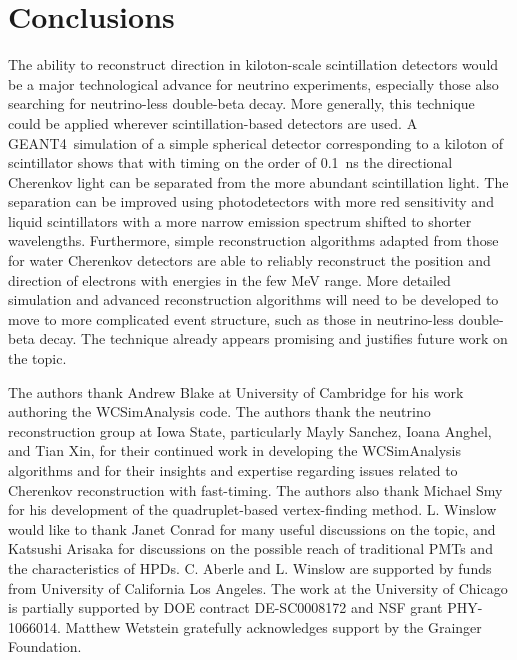 \documentclass[cits]{JINST}
\newcommand{\GEANT}{GEANT4}
\begin{document}
\section{Conclusions}
The ability to reconstruct direction in kiloton-scale scintillation
detectors would be a major technological advance for neutrino
experiments, especially those also
searching for neutrino-less double-beta decay. More generally, this technique could
be applied wherever scintillation-based detectors are used. A \GEANT~simulation of a simple spherical detector corresponding to a kiloton
of scintillator shows that with timing on the order of 0.1~ns the directional Cherenkov light can be separated from the more abundant
scintillation light. The separation can be improved using
photodetectors with more red sensitivity and liquid scintillators with
a more narrow emission spectrum shifted to shorter
wavelengths. Furthermore, simple reconstruction algorithms adapted
from those for water Cherenkov detectors are able to reliably
reconstruct the position and direction of electrons with energies in the few MeV range.
More detailed simulation and advanced reconstruction algorithms will need
to be developed to move to more complicated event structure, such as those in neutrino-less double-beta decay. The technique already
appears promising and justifies future work on the topic.


\acknowledgments
The authors thank Andrew Blake at University of Cambridge for his work
authoring the WCSimAnalysis code. The authors thank the neutrino
reconstruction group at Iowa State, particularly Mayly Sanchez, Ioana
Anghel, and Tian Xin, for their continued work in developing the
WCSimAnalysis algorithms and for their insights and expertise
regarding issues related to Cherenkov reconstruction with
fast-timing. The authors also thank Michael Smy for his development of
the quadruplet-based vertex-finding method. L. Winslow would like to
thank Janet Conrad for many useful discussions on the topic, and
Katsushi Arisaka for discussions on the possible reach of traditional PMTs
and the characteristics of HPDs. C. Aberle and L. Winslow are
supported by funds from University of California Los Angeles. The work
at the University of Chicago is partially supported by DOE
contract DE-SC0008172 and NSF grant PHY-1066014. Matthew Wetstein gratefully
acknowledges support by the Grainger Foundation.

\newpage


 
\end{document}

